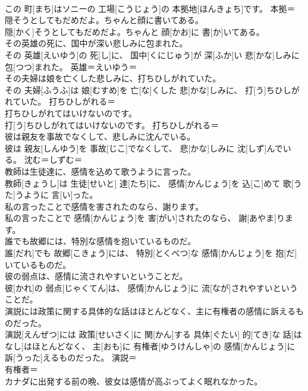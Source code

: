 \documentclass[8pt]{extreport}
\begin{document}
\begin{CJK}{UTF8}{min}
\\	この 町[まち]はソニーの 工場[こうじょう]の 本拠地[ほんきょち]です。	本拠＝ 
\\	隠そうとしてもだめだよ。ちゃんと顔に書いてある。	
\\	隠[かく]そうとしてもだめだよ。ちゃんと 顔[かお]に 書[か]いてある。	
\\	その英雄の死に、国中が深い悲しみに包まれた。	
\\	その 英雄[えいゆう]の 死[し]に、 国中[くにじゅう]が 深[ふか]い 悲[かな]しみに 包[つつ]まれた。	英雄＝えいゆう＝ 
\\	その夫婦は娘を亡くした悲しみに、打ちひしがれていた。	
\\	その 夫婦[ふうふ]は 娘[むすめ]を 亡[な]くした 悲[かな]しみに、 打[う]ちひしがれていた。	打ちひしがれる＝ 
\\	打ちひしがれてはいけないのです。	
\\	打[う]ちひしがれてはいけないのです。	打ちひしがれる＝ 
\\	彼は親友を事故でなくして、悲しみに沈んでいる。	
\\	彼は 親友[しんゆう]を 事故[じこ]でなくして、 悲[かな]しみに 沈[しず]んでいる。	沈む＝しずむ＝ 
\\	教師は生徒達に、感情を込めて歌うように言った。	
\\	教師[きょうし]は 生徒[せいと] 達[たち]に、 感情[かんじょう]を 込[こ]めて 歌[うた]うように 言[い]った。	
\\	私の言ったことで感情を害されたのなら、謝ります。	
\\	私の言ったことで 感情[かんじょう]を 害[がい]されたのなら、 謝[あやま]ります。	
\\	誰でも故郷には、特別な感情を抱いているものだ。	
\\	誰[だれ]でも 故郷[こきょう]には、 特別[とくべつ]な 感情[かんじょう]を 抱[だ]いているものだ。	
\\	彼の弱点は、感情に流されやすいということだ。	
\\	彼[かれ]の 弱点[じゃくてん]は、 感情[かんじょう]に 流[なが]されやすいということだ。	
\\	演説には政策に関する具体的な話はほとんどなく、主に有権者の感情に訴えるものだった。	
\\	演説[えんぜつ]には 政策[せいさく]に 関[かん]する 具体[ぐたい] 的[てき]な 話[はなし]はほとんどなく、 主[おも]に 有権者[ゆうけんしゃ]の 感情[かんじょう]に 訴[うった]えるものだった。	演説＝ 
\\	有権者＝ 
\\	カナダに出発する前の晩、彼女は感情が高ぶってよく眠れなかった。	

\end{CJK}
\end{document}
